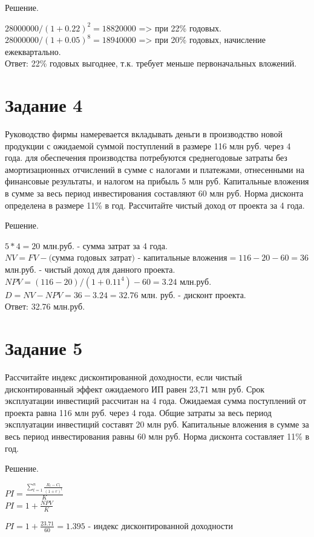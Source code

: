 \documentclass[14pt,a4paper]{extarticle}
\begin{document}
Решение.

$28 000 000 / (1 + 0.22)^2 = 18 820 000$ => при 22\% годовых. \\
$28 000 000 / (1 + 0.05)^8 = 18 940 000$ => при 20\% годовых, начисление ежеквартально. \\

Ответ: 22\% годовых выгоднее, т.к. требует меньше первоначальных вложений.

\section{Задание 4}

Руководство фирмы намеревается вкладывать деньги в производство новой продукции
с ожидаемой суммой поступлений в размере 116 млн руб. через 4 года. для
обеспечения производства потребуются среднегодовые затраты без амортизационных
отчислений в сумме с налогами и платежами, отнесенными на финансовые
результаты, и налогом на прибыль 5 млн руб. Капитальные вложения в сумме за
весь период инвестирования составляют 60 млн руб. Норма дисконта определена в
размере 11\% в год. Рассчитайте чистый доход от проекта за 4 года.

Решение.

$5 * 4 = 20$ млн.руб. - сумма затрат за 4 года.\\
$NV = FV - (\text{сумма годовых затрат) - капитальные вложения} = 116 - 20 - 60 = 36$ млн.руб. - чистый доход для данного проекта.\\
$NPV = (116 - 20) / (1 + 0.11^4) - 60 = 3.24$ млн.руб.\\
$D = NV - NPV = 36 - 3.24 = 32.76$ млн. руб. - дисконт проекта.\\

Ответ: 32.76 млн.руб.

\section{Задание 5}
Рассчитайте индекс дисконтированной доходности, если чистый дисконтированный
эффект ожидаемого ИП равен 23,71 млн руб. Срок эксплуатации инвестиций
рассчитан на 4 года. Ожидаемая сумма поступлений от проекта равна 116 млн руб.
через 4 года. Общие затраты за весь период эксплуатации инвестиций составят 20
млн руб. Капитальные вложения в сумме за весь период инвестирования равны 60
млн руб. Норма дисконта составляет 11\% в год.

Решение.
\begin{center}
    $PI = \frac{\sum_{t=1}^{n} \frac{R_t - C_t}{(1+r)^t}}{K}$\\
    $PI = 1 + \frac{NPV}{K}$\\
\end{center}
    $ PI = 1 + \frac{23.71}{60} = 1.395 $ - индекс дисконтированной доходности \\
\end{document}
